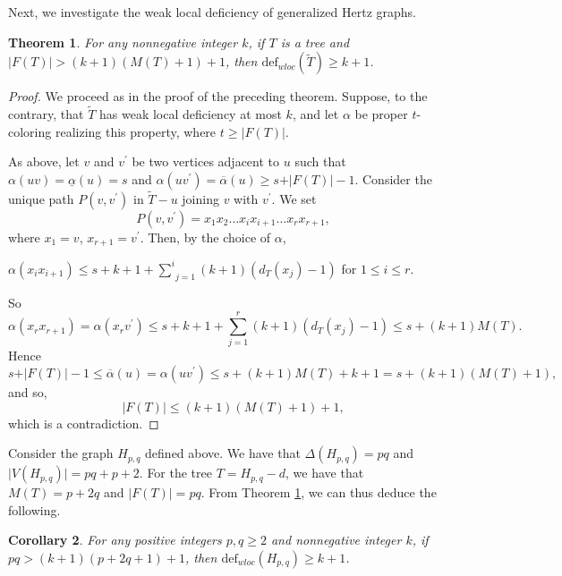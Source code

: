 \documentclass[12pt]{article}
\theoremstyle{plain}
\newtheorem{theorem}{Theorem}[section]
\newtheorem{corollary}[theorem]{Corollary}
\theoremstyle{definition}
\numberwithin{equation}{section}
\begin{document}
Next, we investigate the weak local deficiency of generalized Hertz graphs.

\begin{theorem}
\label{treess} For any nonnegative integer $k$, if $T$ is a tree and $\vert F(T)\vert >
(k+1)(M(T)+1)+1$, then $\mathrm{def}_{wloc}(\widetilde{T})\geq k+1$.
\end{theorem}
\begin{proof}
We proceed as in the proof of the preceding theorem.
Suppose, to the contrary, that $\widetilde{T}$ has weak local deficiency at most $k$, and
let $\alpha$ be proper $t$-coloring realizing this property, where $t\geq \vert F(T)\vert$.

As above, let $v$ and $v^{\prime}$ be two vertices adjacent to $u$ such that 
$\alpha(uv)=\underline{\alpha}(u)=s$ and
$\alpha(uv^{\prime})=\overline{\alpha}(u)\geq s+\vert F(T)\vert-1$. Consider the unique path
$P(v,v^{\prime})$ in $\widetilde{T}-u$ joining $v$ with
$v^{\prime}$. We set
$$P(v,v^{'})=x_{1}x_{2}\ldots x_{i}x_{i+1}\ldots
x_{r} x_{r+1},$$ 
where $x_{1}=v$, $x_{r+1}=v^{\prime}$.
Then, by the choice of $\alpha$,
\begin{center}
$\alpha(x_{i}x_{i+1})\leq s+k+1+\underset{j=1}{\overset{i}{\sum
}}(k+1)(d_{T}(x_{j})-1)$ for $1\leq i\leq r$.
\end{center}
So
%
$$\alpha(x_{r}x_{r+1})=\alpha(x_{r}v^{\prime})\leq
s+k+1+\underset{j=1}{\overset{r}{\sum
}}(k+1)(d_{T}(x_{j})-1)\leq s+(k+1)M(T).$$
%
%
Hence
%
$$s+\vert F(T)\vert-1\leq \overline{\alpha}(u)=\alpha(uv^{\prime})\leq
s+(k+1)M(T)+k+1=s+(k+1)(M(T)+1),$$ 
and so,
$$\vert F(T)\vert\leq (k+1)(M(T)+1)+1,$$
which is a contradiction. 
\end{proof}


Consider the graph $H_{p,q}$ defined above.  
We have that $\Delta (H_{p,q})=pq$ and $\vert V(H_{p,q})\vert=pq+p+2$. For the tree $T=H_{p,q}-d$, we have that $M(T)=p+2q$ and
$\vert F(T)\vert=pq$. From Theorem \ref{treess}, we can thus deduce the following.

\begin{corollary}
\label{Hertz graphss} For any positive integers $p,q\geq 2$ and nonnegative 
integer $k$, if $pq>(k+1)(p+2q+1)+1$, then $\mathrm{def}_{wloc}(H_{p,q})\geq k+1$.
\end{corollary}
\end{document}
